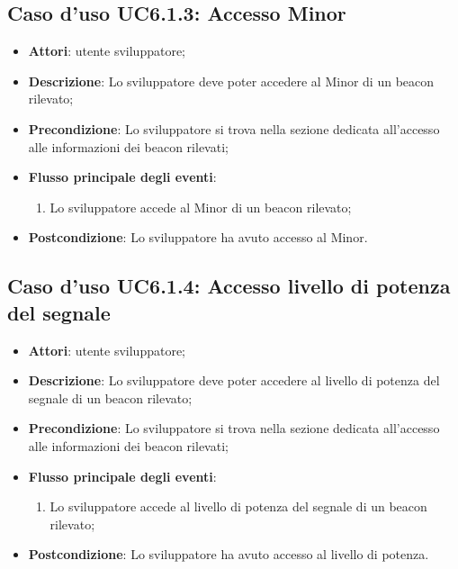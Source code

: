\documentclass[../AnalisiDeiRequisiti.tex]{subfiles}
\begin{document}
\subsection{Caso d'uso UC6.1.3: Accesso Minor}
\begin{itemize}
\item \textbf{Attori}: utente sviluppatore;
\item \textbf{Descrizione}: Lo sviluppatore deve poter accedere al Minor di un beacon rilevato; 
      \item \textbf{Precondizione}: Lo sviluppatore si trova nella sezione dedicata all'accesso alle informazioni dei beacon rilevati;

        \item \textbf{Flusso principale degli eventi}:
          \begin{enumerate}
          \item Lo sviluppatore accede al Minor di un beacon rilevato;

      \end{enumerate}
    \item \textbf{Postcondizione}: Lo sviluppatore ha avuto accesso al Minor.
  \end{itemize}
\hypertarget{UC6.1.4}{}
\subsection{Caso d'uso UC6.1.4: Accesso livello di potenza del segnale}
\begin{itemize}
\item \textbf{Attori}: utente sviluppatore;
\item \textbf{Descrizione}: Lo sviluppatore deve poter accedere al livello di potenza del segnale di un beacon rilevato; 
      \item \textbf{Precondizione}: Lo sviluppatore si trova nella sezione dedicata all'accesso alle informazioni dei beacon rilevati;

        \item \textbf{Flusso principale degli eventi}:
          \begin{enumerate}
          \item Lo sviluppatore accede al livello di potenza del segnale di un beacon rilevato;

      \end{enumerate}
    \item \textbf{Postcondizione}: Lo sviluppatore ha avuto accesso al livello di potenza.
  \end{itemize}
\hypertarget{UC6.1.5}{}
\end{document}
